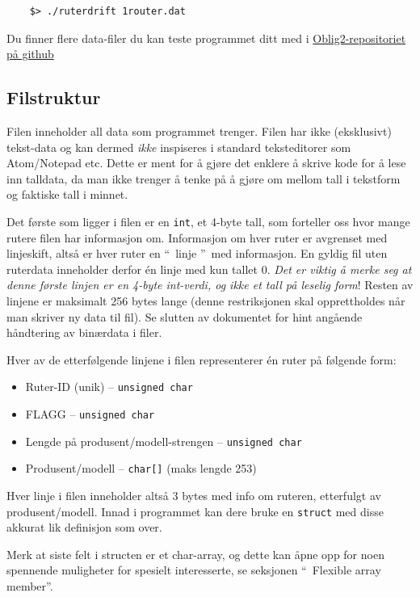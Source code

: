 \documentclass[norsk]{article}
\begin{document}
\begin{verbatim}
    $> ./ruterdrift 1router.dat
\end{verbatim}

Du finner flere data-filer du kan teste programmet ditt med i \href{http://github.uio.no/INF1060/Oblig2}{Oblig2-repositoriet på github}

\subsection*{Filstruktur}
Filen inneholder all data som programmet trenger. Filen har ikke (eksklusivt) tekst-data og kan dermed \textit{ikke} inspiseres i standard teksteditorer som Atom/Notepad etc. Dette er ment for å gjøre det enklere å skrive kode for å lese inn talldata, da man ikke trenger å tenke på å gjøre om mellom tall i tekstform og faktiske tall i minnet.

Det første som ligger i filen er en \texttt{int}, et 4-byte tall, som forteller oss hvor mange rutere filen har informasjon om. Informasjon om hver ruter er avgrenset med linjeskift, altså er hver ruter en \textquotedblleft~linje \textquotedblright~med informasjon. En gyldig fil uten ruterdata inneholder derfor én linje med kun tallet 0. \textit{Det er viktig å merke seg at denne første linjen er en 4-byte int-verdi, og ikke et tall på leselig form}! Resten av linjene er maksimalt 256 bytes lange (denne restriksjonen skal opprettholdes når man skriver ny data til fil). Se slutten av dokumentet for hint angående håndtering av binærdata i filer.

\clearpage

\noindent Hver av de etterfølgende linjene i filen representerer én ruter på følgende form:

\begin{itemize}
    \item Ruter-ID (unik) -- \texttt{unsigned char}
    \item FLAGG -- \texttt{unsigned char}
    \item Lengde på produsent/modell-strengen -- \texttt{unsigned char}
    \item Produsent/modell -- \texttt{char[]} (maks lengde 253)
\end{itemize}

Hver linje i filen inneholder altså 3 bytes med info om ruteren, etterfulgt av produsent/modell. Innad i programmet kan dere bruke en \texttt{struct} med disse akkurat lik definisjon som over.

\noindent Merk at siste felt i structen er et char-array, og dette kan åpne opp for noen spennende muligheter for spesielt interesserte, se seksjonen \textquotedblleft~Flexible array member\textquotedblright.
\end{document}
